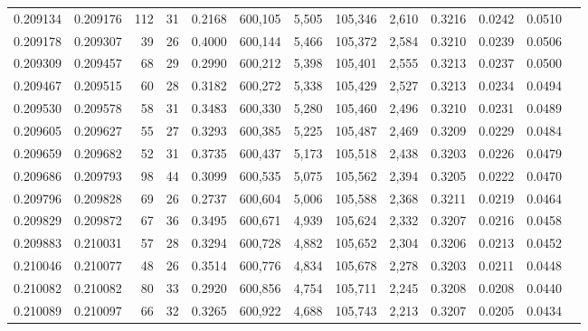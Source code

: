 \begin{tabular}{rrrrrrrrrrrrr}
0.209134 & 0.209176 &   112 &  31 &                                     0.2168 & 600,105 &   5,505 & 105,346 &   2,610 & 0.3216 & 0.0242 & 0.0510 \\
0.209178 & 0.209307 &    39 &  26 &                                     0.4000 & 600,144 &   5,466 & 105,372 &   2,584 & 0.3210 & 0.0239 & 0.0506 \\
0.209309 & 0.209457 &    68 &  29 &                                     0.2990 & 600,212 &   5,398 & 105,401 &   2,555 & 0.3213 & 0.0237 & 0.0500 \\
0.209467 & 0.209515 &    60 &  28 &                                     0.3182 & 600,272 &   5,338 & 105,429 &   2,527 & 0.3213 & 0.0234 & 0.0494 \\
0.209530 & 0.209578 &    58 &  31 &                                     0.3483 & 600,330 &   5,280 & 105,460 &   2,496 & 0.3210 & 0.0231 & 0.0489 \\
0.209605 & 0.209627 &    55 &  27 &                                     0.3293 & 600,385 &   5,225 & 105,487 &   2,469 & 0.3209 & 0.0229 & 0.0484 \\
0.209659 & 0.209682 &    52 &  31 &                                     0.3735 & 600,437 &   5,173 & 105,518 &   2,438 & 0.3203 & 0.0226 & 0.0479 \\
0.209686 & 0.209793 &    98 &  44 &                                     0.3099 & 600,535 &   5,075 & 105,562 &   2,394 & 0.3205 & 0.0222 & 0.0470 \\
0.209796 & 0.209828 &    69 &  26 &                                     0.2737 & 600,604 &   5,006 & 105,588 &   2,368 & 0.3211 & 0.0219 & 0.0464 \\
0.209829 & 0.209872 &    67 &  36 &                                     0.3495 & 600,671 &   4,939 & 105,624 &   2,332 & 0.3207 & 0.0216 & 0.0458 \\
0.209883 & 0.210031 &    57 &  28 &                                     0.3294 & 600,728 &   4,882 & 105,652 &   2,304 & 0.3206 & 0.0213 & 0.0452 \\
0.210046 & 0.210077 &    48 &  26 &                                     0.3514 & 600,776 &   4,834 & 105,678 &   2,278 & 0.3203 & 0.0211 & 0.0448 \\
0.210082 & 0.210082 &    80 &  33 &                                     0.2920 & 600,856 &   4,754 & 105,711 &   2,245 & 0.3208 & 0.0208 & 0.0440 \\
0.210089 & 0.210097 &    66 &  32 &                                     0.3265 & 600,922 &   4,688 & 105,743 &   2,213 & 0.3207 & 0.0205 & 0.0434 \\

\end{tabular}
